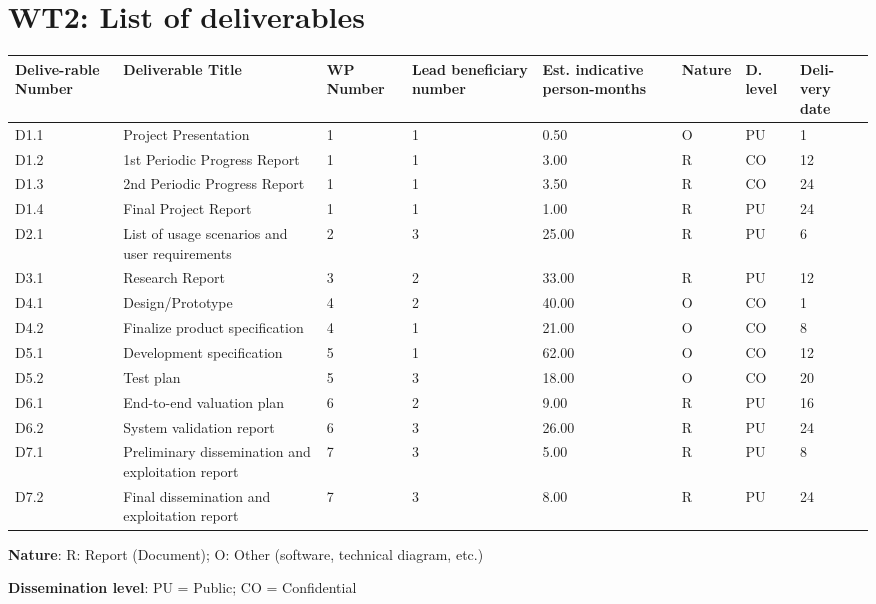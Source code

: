\documentclass{article}
\begin{document}
\section{WT2: List of deliverables}
\begin{center}
	\begin{tabular}{ |p{1cm}|p{2.5cm}|p{0.8cm}|p{0.8cm}|p{0.9cm}|p{1cm}|p{0.5cm}|p{0.8cm}| }
		\hline
		Delive-rable Number & Deliverable Title & WP Number & Lead beneficiary number & Est. indicative person-months & Nature & D. level & Deli-very date \\ \hline
		D1.1 & Project Presentation & 1 & 1 & 0.50 & O & PU & 1 \\ \hline
		D1.2 & 1st Periodic Progress Report & 1 & 1 & 3.00 & R & CO & 12 \\ \hline
		D1.3 & 2nd Periodic Progress Report & 1 & 1 & 3.50 & R & CO & 24 \\ \hline
		D1.4 & Final Project Report & 1 & 1 & 1.00 & R & PU & 24 \\ \hline
		D2.1 & List of usage scenarios and user requirements & 2 & 3 & 25.00 & R & PU & 6 \\ \hline
		D3.1 & Research Report & 3 & 2 & 33.00 & R & PU & 12 \\ \hline
		D4.1 & Design/Prototype  & 4 & 2 & 40.00 & O & CO & 1 \\ \hline
		D4.2 & Finalize product specification  & 4 & 1 & 21.00 & O & CO & 8 \\ \hline
		D5.1 & Development specification & 5 & 1 & 62.00 & O & CO & 12 \\ \hline
		D5.2 & Test plan & 5 & 3 & 18.00 & O & CO & 20 \\ \hline
		D6.1 & End-to-end valuation plan
 & 6 & 2 & 9.00 & R & PU & 16 \\ \hline
		D6.2 & System validation report & 6 & 3 & 26.00 & R & PU & 24 \\ \hline
		D7.1 & Preliminary dissemination and exploitation report
 & 7 & 3 & 5.00 & R & PU & 8 \\ \hline
		D7.2 & Final dissemination and exploitation report & 7 & 3 & 8.00 & R & PU & 24 \\ \hline
	\end{tabular}
\end{center}

\textbf{Nature}: R: Report (Document); O: Other (software, technical diagram, etc.)

\textbf{Dissemination level}: PU = Public; CO = Confidential
\end{document}
